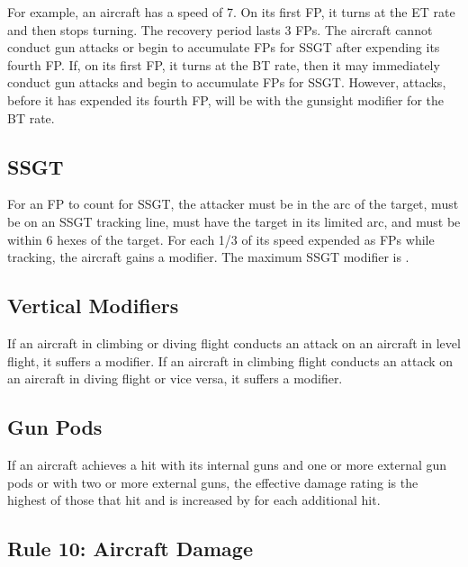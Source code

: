 \documentclass[10pt]{article}
\begin{document}
For example, an aircraft has a speed of 7. On its first FP, it turns at the ET rate and then stops turning. The recovery period lasts 3 FPs. The aircraft cannot conduct gun attacks or begin to accumulate FPs for SSGT after expending its fourth FP. If, on its first FP, it turns at the BT rate, then it may immediately conduct gun attacks and begin to accumulate FPs for SSGT. However, attacks, before it has expended its fourth FP, will be with the gunsight modifier for the BT rate.

\subsection{SSGT} For an FP to count for SSGT, the attacker must be in the  arc of the target, must be on an SSGT tracking line,  must have the target in its limited arc, and must be within 6 hexes of the target. For each 1/3 of its speed expended as FPs while tracking, the aircraft gains a  modifier. The maximum SSGT modifier is .

\subsection{Vertical Modifiers} If an aircraft in climbing or diving flight conducts an attack on an aircraft in level flight, it suffers a  modifier. If an aircraft in climbing flight conducts an attack on an aircraft in diving flight or vice versa, it suffers a  modifier.

\subsection{Gun Pods} If an aircraft achieves a hit with its internal guns and one or more external gun pods or with two or more external guns, the effective damage rating is the highest of those that hit and is increased by  for each additional hit.

\subsection{Rule 10: Aircraft Damage}
\end{document}
